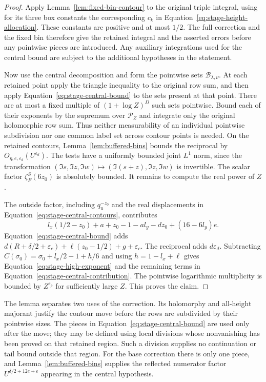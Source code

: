 \documentclass[11pt,a4paper]{article}
\numberwithin{equation}{section}
\numberwithin{figure}{section}
\theoremstyle{definition}
\theoremstyle{remark}
\begin{document}
\begin{proof}
Apply Lemma~\ref{lem:fixed-bin-contour} to the original triple integral,
using for its three box constants the corresponding $c_k$ in
Equation~\eqref{eq:stage-height-allocation}.  These constants are positive
and at most $1/2$.  The full correction and the fixed bin therefore give
the retained integral and the asserted errors before any pointwise pieces
are introduced.  Any auxiliary integrations used for the central bound
are subject to the additional hypotheses in the statement.

Now use the central decomposition and form the
pointwise sets $\mathcal B_{\lambda,\nu}$.  At each retained point apply
the triangle inequality to the original row sum, and then apply
Equation~\eqref{eq:stage-central-bound} to the sets present at that point.
There are at most a fixed multiple of $(1+\log Z)^D$ such sets pointwise.
Bound each of their exponents by the supremum over $\mathcal P_Z$ and
integrate only the original holomorphic row sum.  Thus neither measurability
of an individual pointwise subdivision nor one common label set across
contour points is needed.  On the retained contours,
Lemma~\ref{lem:buffered-bins} bounds the reciprocal by
$O_{\eta,e,\varepsilon_d}(U^{\varepsilon_d})$.  The tests have a uniformly
bounded joint $L^1$ norm, since the transformation
$(\Im s,\Im z,\Im w)\mapsto(\Im(s+z),\Im z,\Im w)$ is invertible.
The scalar factor $\zeta_F^S(6z_0)$ is absolutely bounded.  It remains to
compute the real power of $Z$.

The outside factor, including $q_u^{-z_0}$ and the real displacements in
Equation~\eqref{eq:stage-central-contours}, contributes
\[
 l_x(1/2-z_0)+a+z_0-1-a l_y-dz_0+(16-6l_y)e.
\]
Equation~\eqref{eq:stage-central-bound} adds
$d(R+\delta/2+\varepsilon_c)+\ell(z_0-1/2)+g+\varepsilon_c$.
The reciprocal adds $d\varepsilon_d$.  Subtracting
$C(\sigma_0)=\sigma_0+l_x/2-1+h/6$ and using
$h=1-l_x+\ell$ gives Equation~\eqref{eq:stage-high-exponent} and the
remaining terms in Equation~\eqref{eq:stage-central-contribution}.
The pointwise logarithmic multiplicity is bounded by
$Z^{\varepsilon_p}$ for sufficiently large $Z$.  This proves the claim.
\end{proof}

The lemma separates two uses of the correction.  Its holomorphy and
all-height majorant justify the contour move before the rows are subdivided
by their pointwise sizes.  The pieces in
Equation~\eqref{eq:stage-central-bound} are used only after the move; they
may be defined using local divisions whose nonvanishing has been proved on
that retained region.  Such a division supplies no continuation or tail
bound outside that region.  For the base correction there is only one
piece, and Lemma~\ref{lem:buffered-bins} supplies the reflected numerator
factor $U^{\delta/2+12e+\epsilon}$ appearing in the central hypothesis.
\end{document}
